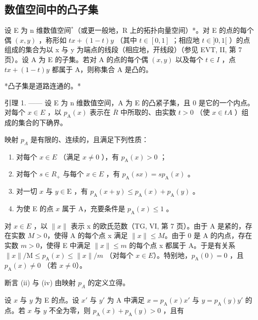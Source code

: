 \subsection{数值空间中的凸子集}

设 E 为 n 维数值空间\(^{*}\)（或更一般地，R 上的拓扑向量空间）*。对 E 的点的每个偶 \((x,y)\) ，称形如 \(tx + (1-t)y\) （其中 \(t \in [0,1]\) ；相应地 \(t \in ]0,1[\) ）的点组成的集合为以 x 与 y 为端点的线段（相应地，开线段）（参见 EVT, II, 第 7 页）。设 A 为 E 的子集。若对 A 的点的每个偶 \((x,y)\) 以及每个 \(t \in I\) ，点 \(tx + (1-t)y\) 都属于 A，则称集合 A 是凸的。

*凸子集是道路连通的。*

引理 1. —— 设 E 为 n 维数值空间，A 为 E 的凸紧子集，且 0 是它的一个内点。对每个 \(x \in E\) ，以 \(p_{\mathrm{A}}(x)\) 表示在 \(\overline{R}\) 中所取的、由实数 \(t > 0\) （使 \(x \in tA\) ）组成的集合的下确界。

映射 \(p_{A}\) 是有限的、连续的，且满足下列性质：

\begin{enumerate}
\def\labelenumi{(\roman{enumi})}
\item
  对每个 \(x \in E\) （满足 \(x \neq 0\) ），有 \(p_{\mathrm{A}}(x) > 0\) ；
\item
  对每个 \(s \in R_{+}\) 与每个 \(x \in E\) ，有 \(p_{\mathrm{A}}(sx) = sp_{\mathrm{A}}(x)\) 。
\item
  对一切 \(x\) 与 \(y \in \mathrm{E}\) ，有 \(p_{\mathrm{A}}(x + y) \leqslant p_{\mathrm{A}}(x) + p_{\mathrm{A}}(y)\) 。
\item
  为使 E 的点 \(x\) 属于 A，充要条件是 \(p_{\mathrm{A}}(x) \leqslant 1\) 。
\end{enumerate}

对 \(x \in E\) ，以 \(\|x\|\) 表示 x 的欧氏范数（TG, VI, 第 7 页）。由于 A 是紧的，存在实数 \(M > 0\)，使得 A 的每个点 x 满足 \(\|x\| \leqslant M\)。由于 0 是 A 的内点，存在实数 \(m > 0\)，使得 E 中满足 \(\|x\| \leqslant m\) 的每个点 x 都属于 A。于是有关系 \(\|x\|/\mathrm{M} \leqslant p_{\mathrm{A}}(x) \leqslant \|x\|/m\) （对每个 \(x \in E\)）。特别地，\(p_{\mathrm{A}}(0) = 0\) ，且 \(p_{\mathrm{A}}(x) \neq 0\) （若 \(x \neq 0\)）。

断言 (ii) 与 (iv) 由映射 \(p_{A}\) 的定义立得。

设 \(x\) 与 \(y\) 为 E 的点。设 \(x'\) 与 \(y'\) 为 A 中满足 \(x = p_{\mathrm{A}}(x)x'\) 与 \(y = p_{\mathrm{A}}(y)y'\) 的点。若 \(x\) 与 \(y\) 不全为零，则 \(p_{\mathrm{A}}(x) + p_{\mathrm{A}}(y) > 0\) ，且有

